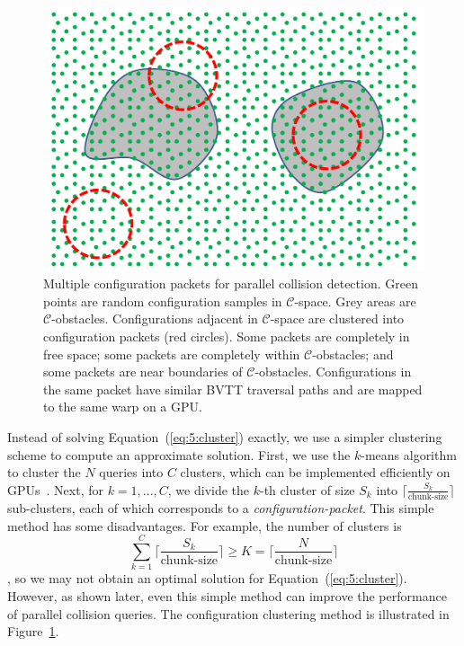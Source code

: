 \begin{figure}[htb]
\centering
\includegraphics[width=\linewidth]{figs/5/collisionpacket.pdf}
\caption[Multiple configuration packet for parallel collision detection]{Multiple configuration packets for parallel collision detection. Green points are random configuration samples in $\mathcal{C}$-space. Grey areas are $\mathcal{C}$-obstacles. Configurations adjacent in $\mathcal{C}$-space are clustered into configuration packets (red circles). Some packets are completely in free space; some packets are completely within $\mathcal{C}$-obstacles; and some packets are near boundaries of $\mathcal{C}$-obstacles. Configurations in the
same packet have similar BVTT traversal paths and are mapped to the same warp on a GPU.}
  \label{fig:5:collisionpacket}
\end{figure}

Instead of solving Equation~(\ref{eq:5:cluster}) exactly, we use a simpler clustering scheme to compute an approximate solution. First, we use the $k$-means algorithm to cluster the $N$ queries into $C$ clusters, which can be implemented efficiently on GPUs~\cite{Che:2008}. Next, for $k = 1, ..., C$, we divide the $k$-th cluster of size $S_k$
into $\lceil \frac{S_k}{\text{chunk-size}}\rceil$ sub-clusters, each of which corresponds to a \emph{configuration-packet}. This simple method has some disadvantages. For example,
the number of clusters is $$\sum_{k=1}^C \lceil \frac{S_k}{\text{chunk-size}}\rceil \geq K = \lceil \frac{N}{\text{chunk-size}} \rceil$$, so we may not obtain an optimal solution for 
Equation~(\ref{eq:5:cluster}). However, as shown later, even this simple method can improve the performance
of parallel collision queries. The configuration clustering method is illustrated in
Figure~\ref{fig:5:collisionpacket}.

